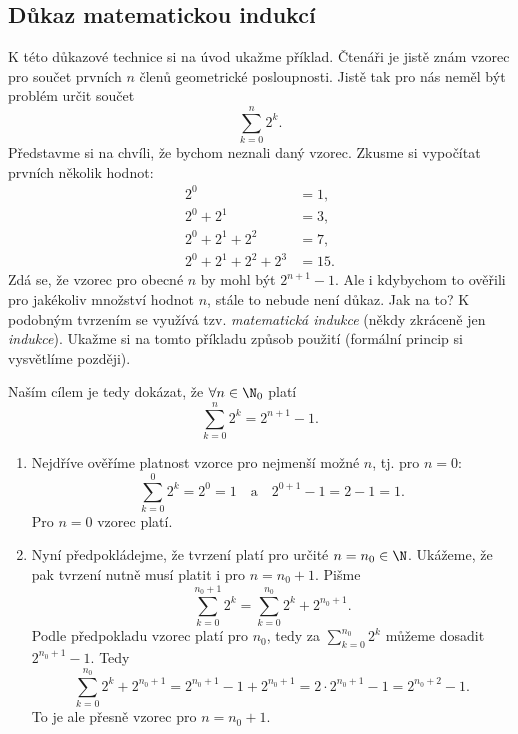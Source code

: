 \subsection{Důkaz matematickou indukcí}\label{subsec:dukaz_indukci}
K této důkazové technice si na úvod ukažme příklad. Čtenáři je jistě znám vzorec pro součet prvních $n$ členů geometrické posloupnosti. Jistě tak pro nás neměl být problém určit součet
\begin{equation*}
    \sum_{k=0}^{n}{2^k}.
\end{equation*}
Představme si na chvíli, že bychom neznali daný vzorec. Zkusme si vypočítat prvních několik hodnot:
\begin{align*}
    2^0&=1,\\
    2^0+2^1&=3,\\
    2^0+2^1+2^2&=7,\\
    2^0+2^1+2^2+2^3&=15.
\end{align*}
Zdá se, že vzorec pro obecné $n$ by mohl být $2^{n+1}-1$. Ale i kdybychom to ověřili pro jakékoliv množství hodnot $n$, stále to nebude není důkaz. Jak na to? K podobným tvrzením se využívá tzv. \emph{matematická indukce} (někdy zkráceně jen \emph{indukce}). Ukažme si na tomto příkladu způsob použití (formální princip si vysvětlíme později).\par
Naším cílem je tedy dokázat, že $\forall n\in\N_0$ platí
\begin{equation*}
    \sum_{k=0}^{n}{2^k}=2^{n+1}-1.
\end{equation*}
\begin{enumerate}[label=(\roman*)]
    \item\label{item:zaklad_indukce} Nejdříve ověříme platnost vzorce pro nejmenší možné $n$, tj. pro $n=0$:
    \begin{equation*}
        \sum_{k=0}^{0}{2^k}=2^0=1\quad\text{a}\quad2^{0+1}-1=2-1=1.
    \end{equation*}
    Pro $n=0$ vzorec platí.
    \item\label{item:indukcni_krok} Nyní předpokládejme, že tvrzení platí pro určité $n=n_0\in\N$. Ukážeme, že pak tvrzení nutně musí platit i pro $n=n_0+1$. Pišme
    \begin{equation*}
        \sum_{k=0}^{n_0+1}{2^k}=\sum_{k=0}^{n_0}{2^k}+2^{n_0+1}.
    \end{equation*}
    Podle předpokladu vzorec platí pro $n_0$, tedy za $\sum_{k=0}^{n_0}{2^k}$ můžeme dosadit $2^{n_0+1}-1$. Tedy
    \begin{equation*}
        \sum_{k=0}^{n_0}{2^k}+2^{n_0+1}=2^{n_0+1}-1+2^{n_0+1}=2\cdot 2^{n_0+1}-1=2^{n_0+2}-1.
    \end{equation*}
    To je ale přesně vzorec pro $n=n_0+1$.
\end{enumerate}
